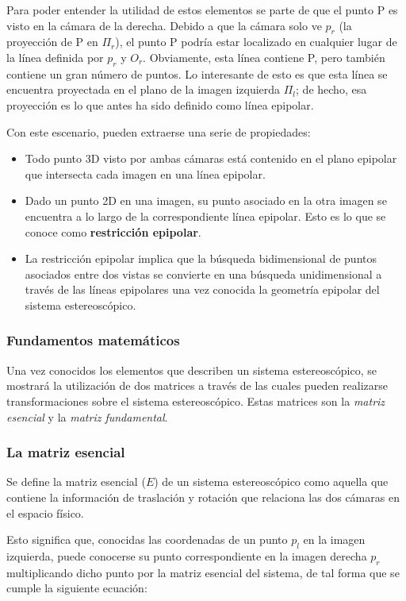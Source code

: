 Para poder entender la utilidad de estos elementos se parte de que el punto P es visto en la cámara de la derecha. Debido a que la cámara solo ve $p_{r}$ (la proyección de P en $\Pi_{r}$), el punto P podría estar localizado en cualquier lugar de la línea definida por $p_{r}$ y $O_{r}$. Obviamente, esta línea contiene P, pero también contiene un gran número de puntos. Lo interesante de esto es que esta línea se encuentra proyectada en el plano de la imagen izquierda $\Pi_{l}$; de hecho, esa proyección es lo que antes ha sido definido como línea epipolar.

Con este escenario, pueden extraerse una serie de propiedades:

\begin{itemize}
\item Todo punto 3D visto por ambas cámaras está contenido en el plano epipolar que intersecta cada imagen en una línea epipolar.
\item Dado un punto 2D en una imagen, su punto asociado en la otra imagen se encuentra a lo largo de la correspondiente línea epipolar. Esto es lo que se conoce como \textbf{restricción epipolar}.
\item La restricción epipolar implica que la búsqueda bidimensional de puntos asociados entre dos vistas se convierte en una búsqueda unidimensional a través de las líneas epipolares una vez conocida la geometría epipolar del sistema estereoscópico.
\end{itemize}


\subsubsection{Fundamentos matemáticos}

Una vez conocidos los elementos que describen un sistema estereoscópico, se mostrará la utilización de dos matrices a través de las cuales pueden realizarse transformaciones sobre el sistema estereoscópico. Estas matrices son la \textit{matriz esencial} y la \textit{matriz fundamental}.

\subsubsection{La matriz esencial}

Se define la matriz esencial ($E$) de un sistema estereoscópico como aquella que contiene la información de traslación y rotación que relaciona las dos cámaras en el espacio físico.

Esto significa que, conocidas las coordenadas de un punto $p_{l}$ en la imagen izquierda, puede conocerse su punto correspondiente en la imagen derecha $p_{r}$ multiplicando dicho punto por la matriz esencial del sistema, de tal forma que se cumple la siguiente ecuación:

